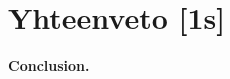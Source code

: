 \documentclass[finnish, grading]{tktltiki2}
\theoremstyle{definition}
\theoremstyle{remark}
\begin{document}



\section{Yhteenveto [1s]}

\textbf{Conclusion.}

 






 





%
%
\newpage

%

%





% 
\end{document}

